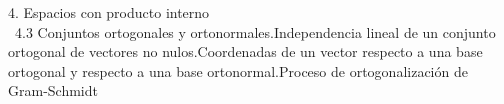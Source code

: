 \documentclass[preview]{standalone}
\begin{document}
\begin{center}
4. Espacios con producto interno \\\ 4.3 Conjuntos ortogonales y ortonormales.Independencia lineal de un conjunto ortogonal de vectores no nulos.Coordenadas de un vector respecto a una base ortogonal y respecto a una base ortonormal.Proceso de ortogonalización de Gram-Schmidt
\end{center}
\end{document}
